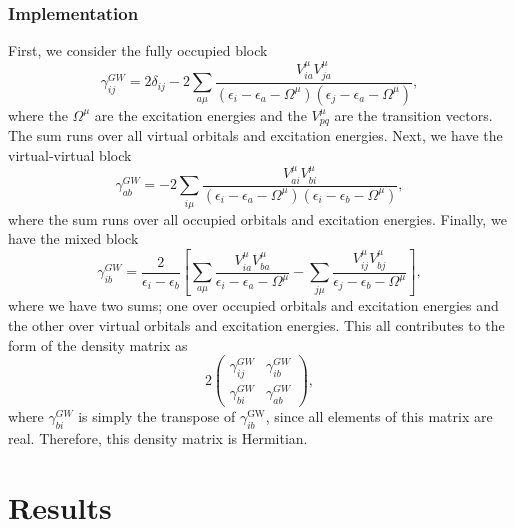 \documentclass[12pt]{caltech_thesis}
\begin{document}
\subsection{Implementation}
First, we consider the fully occupied block
\begin{equation}
\gamma_{ij}^{GW}=2\delta_{ij}-2\sum_{a\mu} \frac{{V}_{ia}^\mu {V}_{ja}^\mu}{\left(\epsilon_{i}-\epsilon_{a}-{\Omega ^{\mu}}\right)\left(\epsilon_{j}-\epsilon_{a}-{\Omega ^{\mu}}\right)},
\end{equation}
where the ${\Omega ^{\mu}}$ are the excitation energies and the ${V}_{pq}^{\mu}$ are the transition vectors. The sum runs over all virtual orbitals and excitation energies. Next, we have the virtual-virtual block
\begin{equation}
\gamma_{ab}^{GW}=-2\sum_{i\mu} \frac{{V}_{ai}^{\mu} {V}_{bi}^{\mu}}{\left(\epsilon_{i}-\epsilon_{a}-{\Omega ^{\mu}}\right)\left(\epsilon_{i}-\epsilon_{b}-{\Omega ^{\mu}}\right)},
\end{equation}
where the sum runs over all occupied orbitals and excitation energies.
Finally, we have the mixed block
\begin{equation}
    \gamma_{i b}^{G W}=\frac{2}{\epsilon_{i}-\epsilon_{b}}\left[ \sum_{a \mu} \frac{{V}_{i a}^{\mu} {V}_{b a}^{\mu}}{\epsilon_{i}-\epsilon_{a}-{\Omega ^{\mu}}} - \sum_{j \mu} \frac{{V}_{i j}^{\mu} {V}_{bj}^{\mu}}{\epsilon_{j}-\epsilon_{b}-{\Omega ^{\mu}}} \right],
\end{equation}
where we have two sums; one over occupied orbitals and excitation energies and the other over virtual orbitals and excitation energies.
This all contributes to the form of the density matrix as
\begin{equation*}
    2\begin{pmatrix}
        \gamma _{i j}^{G W} & \gamma _{i b}^{G W} \\
        \gamma _{bi}^{G W } & \gamma _{a b}^{G W}
    \end{pmatrix},
\end{equation*}
where $\gamma _{bi}^{G W }$ is simply the transpose of $\gamma _{ib}^{\text{GW}}$, since all elements of this matrix are real. Therefore, this density matrix is Hermitian.



\chapter{Results}
\end{document}
